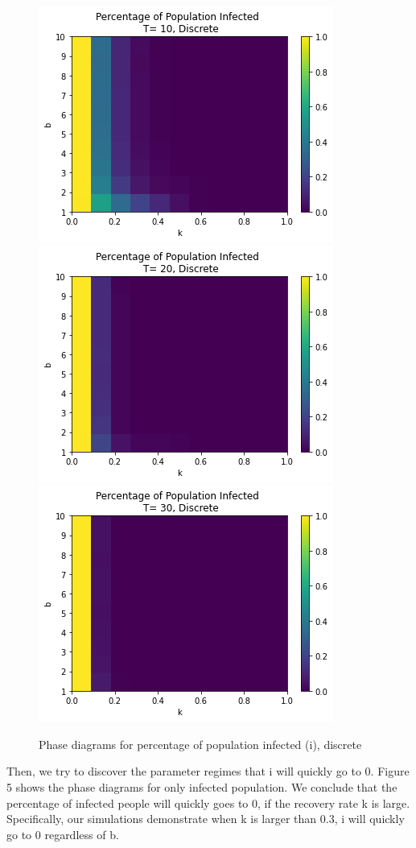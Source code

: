 \documentclass{article}
\begin{document}
\begin{figure}[htp]

\centering
\includegraphics[width=.3\textwidth]{Figure1_discrete_diagT10infect.png}\hfill
\includegraphics[width=.3\textwidth]{Figure1_discrete_diagT20infect.png}\hfill
\includegraphics[width=.3\textwidth]{Figure1_discrete_diagT30infect.png}

\caption{Phase diagrams for percentage of population infected (i), discrete}
\label{fig:figure3}

\end{figure}


Then, we try to discover the parameter regimes that i will quickly go to 0. Figure 5 shows the phase diagrams for only infected population. We conclude that the percentage of infected people will quickly goes to 0, if the recovery rate k is large. Specifically, our simulations demonstrate when k is larger than 0.3, i will quickly go to 0 regardless of b.
\end{document}
